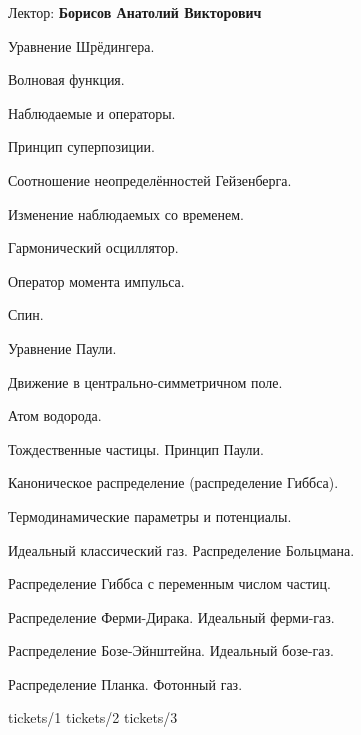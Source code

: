 \documentclass[specialist, subf, href, colorlinks=true, 12pt, times, mtpro, final]{disser}
\begin{document}
\tableofcontents

\newpage
{}
\noindent Лектор: {\bf Борисов Анатолий Викторович}\\

\begin{enumerate}
{\footnotesize
\item Уравнение Шрёдингера.
\item Волновая функция.
\item Наблюдаемые и операторы.
\item Принцип суперпозиции.
\item Соотношение неопределённостей Гейзенберга.
\item Изменение наблюдаемых со временем.
\item Гармонический осциллятор.
\item Оператор момента импульса.
\item Спин.
\item Уравнение Паули.
\item Движение в центрально-симметричном поле.
\item Атом водорода.
\item Тождественные частицы. Принцип Паули.
\item Каноническое распределение (распределение Гиббса).
\item Термодинамические параметры и потенциалы.
\item Идеальный классический газ. Распределение Больцмана. 
\item Распределение Гиббса с переменным числом частиц. 
\item Распределение Ферми-Дирака. Идеальный ферми-газ.
\item Распределение Бозе-Эйнштейна. Идеальный бозе-газ.
\item Распределение Планка. Фотонный газ.
}
\end{enumerate}

 {tickets/1}
 {tickets/2}
 {tickets/3}
 
\end{document}
